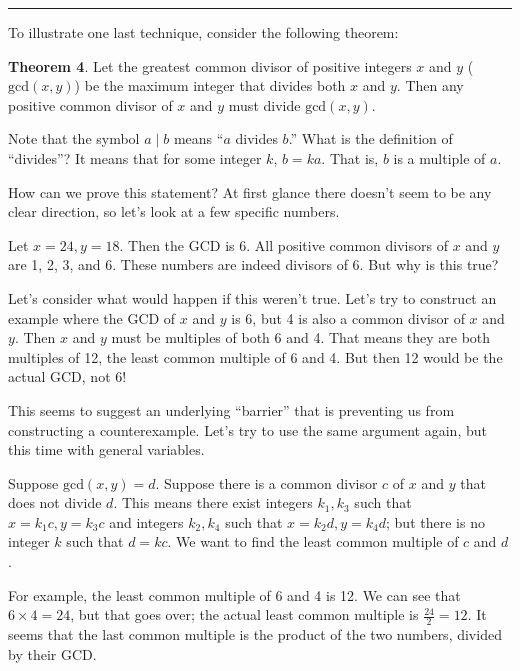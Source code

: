 \documentclass[11pt]{article}
\begin{document}
    \vspace{-10pt}
    \rule{\textwidth}{0.4pt}
    

    To illustrate one last technique, consider the following theorem:
    
    \textbf{Theorem 4}. Let the greatest common divisor of positive integers $x$ and $y$ ($\mathrm{gcd}(x,y)$)
    be the maximum integer that divides both $x$ and $y$. Then any positive common divisor
    of $x$ and $y$ must divide $\mathrm{gcd}(x,y)$.
    
    Note that the symbol $a\mid b$ means ``$a$ divides $b$.'' What is the definition of
    ``divides''? It means that for some integer $k$, $b=ka$. That is, $b$ is a multiple
    of $a$.
    
    How can we prove this statement? At first glance there doesn't seem to be any clear
    direction, so let's look at a few specific numbers.
    
    Let $x=24,y=18$. Then the GCD is 6. All positive common divisors of $x$ and $y$ are
    1, 2, 3, and 6. These numbers are indeed divisors of 6. But why is this true?
    
    Let's consider what would happen if this weren't true. Let's try to construct an
    example where the GCD of $x$ and $y$ is 6, but 4 is also a common divisor of
    $x$ and $y$. Then $x$ and $y$ must be multiples of both 6 and 4. That means
    they are both multiples of 12, the least common multiple of 6 and 4. But then 12
    would be the actual GCD, not 6!
    
    This seems to suggest an underlying ``barrier'' that is preventing us from
    constructing a counterexample. Let's try to use the same argument again, but
    this time with general variables.
    
    Suppose $\mathrm{gcd}(x,y)=d$. Suppose there is a common divisor $c$ of $x$ and
    $y$ that does not divide $d$. This means there exist integers $k_1,k_3$ such that
    $x=k_1c,y=k_3c$ and integers $k_2,k_4$ such that $x=k_2d,y=k_4d$; but there is no
    integer $k$ such that $d=kc$. We want to find the least common multiple of $c$ and
    $d$.
    
    For example, the least common multiple of 6 and 4 is 12. We can see that $6\times4=24$,
    but that goes over; the actual least common multiple is $\frac{24}2=12$. It seems
    that the last common multiple is the product of the two numbers, divided by their
    GCD.
    
\end{document}

